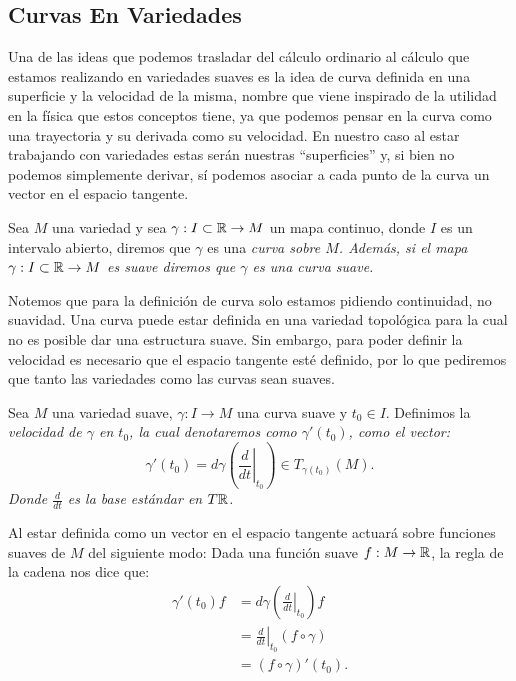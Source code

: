 \subsection{Curvas En Variedades}\label{Subsección: Curvas En Variedades}
Una de las ideas que podemos trasladar del cálculo ordinario al cálculo que estamos realizando en variedades suaves es la idea de curva definida en una superficie y la velocidad de la misma, nombre que viene inspirado de la utilidad en la física que estos conceptos tiene, ya que podemos pensar en la curva como una trayectoria y su derivada como su velocidad.
En nuestro caso al estar trabajando con variedades estas serán nuestras \enquote{superficies} y, si bien no podemos simplemente derivar, sí podemos asociar a cada punto de la curva un vector en el espacio tangente.

\begin{definition}
	Sea $M$ una variedad y sea $\gamma: I \subset \mathbb{R} \to M$ un mapa continuo, donde $I$ es un intervalo abierto, diremos que $\gamma$ es una \it{curva sobre $M$}. Además, si el mapa $\gamma: I \subset \mathbb{R} \to M$ es suave diremos que $\gamma$ es una curva suave.
\end{definition}

Notemos que para la definición de curva solo estamos pidiendo continuidad, no suavidad. Una curva puede estar definida en una variedad topológica para la cual no es posible dar una estructura suave. Sin embargo, para poder definir la velocidad es necesario que el espacio tangente esté definido, por lo que pediremos que tanto las variedades como las curvas sean suaves.

\begin{definition}
	Sea $M$ una variedad suave, $\gamma: I \to M$ una curva suave y $t_0 \in I$. Definimos la \it{velocidad de $\gamma$ en $t_0$}, la cual denotaremos como $\gamma'(t_0)$, como el vector:
	\[
		\gamma'(t_0)
		=
		d\gamma\left( \left.  \frac{d}{dt}\right|_{t_0} \right)
		\in
		T_{\gamma(t_0)}(M).
	\]
	Donde $\frac{d}{dt}$ es la base estándar en $T\mathbb{R}$.
\end{definition}

Al estar definida como un vector en el espacio tangente actuará sobre funciones suaves de $M$ del siguiente modo: Dada una función suave $f: M \to \mathbb{R}$, la regla de la cadena nos dice que:
\begin{align*}
	\gamma'(t_0) f & =d\gamma\left(\left.\frac{d}{dt}\right|_{t_0} \right)f \\
	               & = \left. \frac{d}{dt} \right|_{t_0} (f \circ \gamma)   \\
	               & = (f \circ \gamma)' (t_0).
\end{align*}

